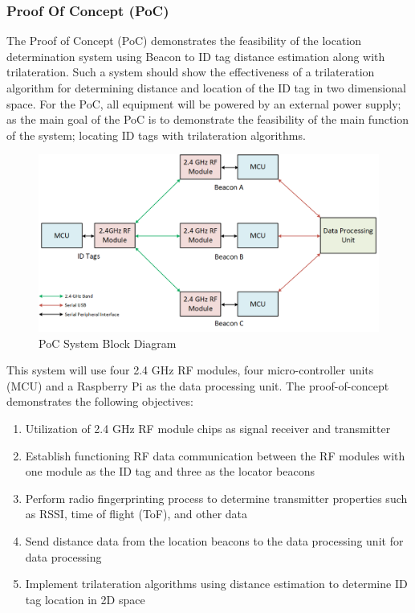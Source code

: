\break
\subsubsection{Proof Of Concept (PoC)}
The Proof of Concept (\Gls{PoC}) demonstrates the feasibility of the location determination system using Beacon to ID tag distance estimation along with trilateration. Such a system should show the effectiveness of a trilateration algorithm for determining distance and location of the ID tag in two dimensional space. For the PoC, all equipment will be powered by an external power supply; as the main goal of the PoC is to demonstrate the feasibility of the main function of the system; locating ID tags with trilateration algorithms.

\begin{figure}[h!]
    \centering
    \includegraphics[width=\linewidth]{./images/01_sys_PoC.png}
    \caption{PoC System Block Diagram}
    \label{fig:PoC_sys_blk}
\end{figure}
\bigskip

This system will use four 2.4 GHz \Gls{RF} modules, four micro-controller units (\Gls{MCU}) and a Raspberry Pi as the data processing unit. The proof-of-concept demonstrates the following objectives:

\begin{enumerate}
    \item Utilization of 2.4 GHz RF module chips as signal receiver and transmitter
    \item Establish functioning RF data communication between the RF modules with one module as the ID tag and three as the locator beacons
    \item Perform radio fingerprinting process to determine transmitter properties such as RSSI, time of flight (\Gls{ToF}), and other data
    \item Send distance data from the location beacons to the data processing unit for data processing
    \item Implement trilateration algorithms using distance estimation to determine ID tag location in 2D space
\end{enumerate}

